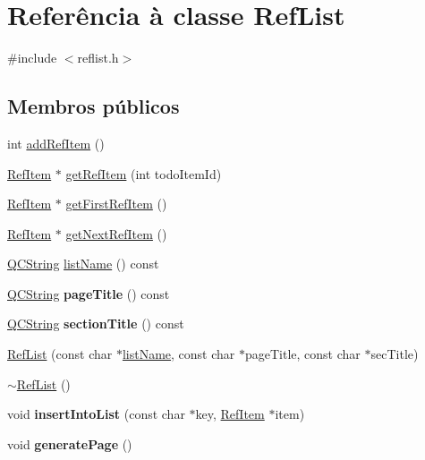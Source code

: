 \hypertarget{class_ref_list}{\section{Referência à classe Ref\-List}
\label{class_ref_list}
}


{\ttfamily \#include $<$reflist.\-h$>$}

\subsection*{Membros públicos}
\begin{DoxyCompactItemize}
\item 
int \hyperlink{class_ref_list_a4956561a932a05cf923378ab6512763a}{add\-Ref\-Item} ()
\item 
\hyperlink{struct_ref_item}{Ref\-Item} $\ast$ \hyperlink{class_ref_list_a9de8a132bd46bf934bc43ea7466725e6}{get\-Ref\-Item} (int todo\-Item\-Id)
\item 
\hyperlink{struct_ref_item}{Ref\-Item} $\ast$ \hyperlink{class_ref_list_afcc28f34f413455d5488ead128f3d263}{get\-First\-Ref\-Item} ()
\item 
\hyperlink{struct_ref_item}{Ref\-Item} $\ast$ \hyperlink{class_ref_list_ab3169ffd83f35b96120f87e0a14c8411}{get\-Next\-Ref\-Item} ()
\item 
\hyperlink{class_q_c_string}{Q\-C\-String} \hyperlink{class_ref_list_afe03499851c5f4ea3d6b76a13e1514e2}{list\-Name} () const 
\item 
\hypertarget{class_ref_list_acc20612d7d3b3ffcab48dda4d6308d5a}{\hyperlink{class_q_c_string}{Q\-C\-String} {\bfseries page\-Title} () const }\label{class_ref_list_acc20612d7d3b3ffcab48dda4d6308d5a}

\item 
\hypertarget{class_ref_list_a680044dbf27288ae1151ae5e43f2963a}{\hyperlink{class_q_c_string}{Q\-C\-String} {\bfseries section\-Title} () const }\label{class_ref_list_a680044dbf27288ae1151ae5e43f2963a}

\item 
\hyperlink{class_ref_list_a87584e9be6e148c2bd3fed39a88d73fb}{Ref\-List} (const char $\ast$\hyperlink{class_ref_list_afe03499851c5f4ea3d6b76a13e1514e2}{list\-Name}, const char $\ast$page\-Title, const char $\ast$sec\-Title)
\item 
\hyperlink{class_ref_list_a1d89f394fee4ed9ab0b7d1d84a917ce4}{$\sim$\-Ref\-List} ()
\item 
\hypertarget{class_ref_list_ac14bc63067d9eff83a5c847db91dbddf}{void {\bfseries insert\-Into\-List} (const char $\ast$key, \hyperlink{struct_ref_item}{Ref\-Item} $\ast$item)}\label{class_ref_list_ac14bc63067d9eff83a5c847db91dbddf}

\item 
\hypertarget{class_ref_list_afcd11b7401fbe2d19945f3292dc56745}{void {\bfseries generate\-Page} ()}\label{class_ref_list_afcd11b7401fbe2d19945f3292dc56745}

\end{DoxyCompactItemize}


